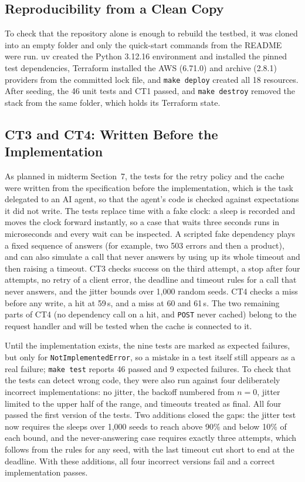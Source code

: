 \documentclass[10pt]{article}
\begin{document}
\subsection{Reproducibility from a Clean Copy}
To check that the repository alone is enough to rebuild the testbed, it was
cloned into an empty folder and only the quick-start commands from the README
were run. uv created the Python 3.12.16 environment and installed the pinned
test dependencies, Terraform installed the AWS (6.71.0) and archive (2.8.1)
providers from the committed lock file, and \texttt{make deploy} created all 18
resources. After seeding, the 46 unit tests and CT1 passed, and
\texttt{make destroy} removed the stack from the same folder, which holds its
Terraform state.

\subsection{CT3 and CT4: Written Before the Implementation}
As planned in midterm Section~7, the tests for the retry policy and the cache
were written from the specification before the implementation, which is the
task delegated to an AI agent, so that the agent's code is checked against
expectations it did not write. The tests replace time with a fake clock: a
sleep is recorded and moves the clock forward instantly, so a case that waits
three seconds runs in microseconds and every wait can be inspected. A scripted
fake dependency plays a fixed sequence of answers (for example, two 503 errors
and then a product), and can also simulate a call that never answers by using
up its whole timeout and then raising a timeout. CT3 checks success on the third
attempt, a stop after four attempts, no retry of a client error, the deadline
and timeout rules for a call that never answers, and the jitter bounds over
1{,}000 random seeds. CT4 checks a miss before any write, a hit at 59\,s, and a
miss at 60 and 61\,s. The two remaining parts of CT4 (no dependency call on a
hit, and \texttt{POST} never cached) belong to the request handler and will be
tested when the cache is connected to it.

Until the implementation exists, the nine tests are marked as expected
failures, but only for \texttt{NotImplementedError}, so a mistake in a test
itself still appears as a real failure; \texttt{make test} reports 46 passed and
9 expected failures. To check that the tests can detect wrong code, they were
also run against four deliberately incorrect implementations: no jitter, the
backoff numbered from $n = 0$, jitter limited to the upper half of the range,
and timeouts treated as final. All four passed the first version of the tests.
Two additions closed the gaps: the jitter test now requires the sleeps over
1{,}000 seeds to reach above 90\% and below 10\% of each bound, and the
never-answering case requires exactly three attempts, which follows from the
rules for any seed, with the last timeout cut short to end at the deadline.
With these additions, all four incorrect versions fail and a correct
implementation passes.
\end{document}
